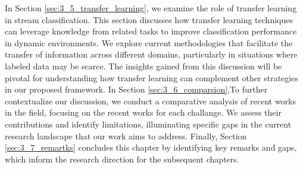 In Section \ref{sec:3_5_transfer_learning}, we examine the role of transfer learning in stream classification. This section discusses how transfer learning techniques can leverage knowledge from related tasks to improve classification performance in dynamic environments. We explore current methodologies that facilitate the transfer of information across different domains, particularly in situations where labeled data may be scarce. The insights gained from this discussion will be pivotal for understanding how transfer learning can complement other strategies in our proposed framework.
In Section \ref{sec:3_6_comparsion},To further contextualize our discussion, we conduct a comparative analysis of recent works in the field, focusing on the recent works for each challange. We assess their contributions and identify limitations, illuminating specific gaps in the current research landscape that our work aims to address.
Finally, Section \ref{sec:3_7_remartks} concludes this chapter by identifying key remarks and gaps, which inform the research direction for the subsequent chapters.


